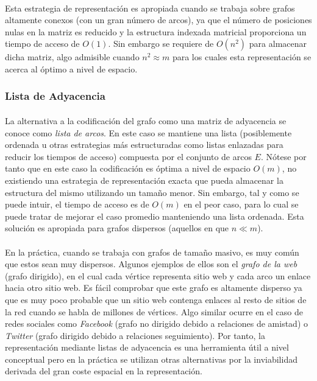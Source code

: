 \documentclass{subfiles}
\begin{document}
          \paragraph{}
          Esta estrategia de representación es apropiada cuando se trabaja sobre grafos altamente conexos (con un gran número de arcos), ya que el número de posiciones nulas en la matriz es reducido y la estructura indexada matricial proporciona un tiempo de acceso de $O(1)$. Sin embargo se requiere de $O(n^2)$ para almacenar dicha matriz, algo admisible cuando $n^2 \approx m$ para los cuales esta representación se acerca al óptimo a nivel de espacio.

        \subsubsection{Lista de Adyacencia}
        \label{sec:adjacency_list}

          \paragraph{}
          La alternativa a la codificación del grafo como una matriz de adyacencia se conoce como \emph{lista de arcos}. En este caso se mantiene una lista (posiblemente ordenada u otras estrategias más estructuradas como listas enlazadas para reducir los tiempos de acceso) compuesta por el conjunto de arcos $E$. Nótese por tanto que en este caso la codificación es óptima a nivel de espacio $O(m)$, no existiendo una estrategia de representación exacta que pueda almacenar la estructura del mismo utilizando un tamaño menor. Sin embargo, tal y como se puede intuir, el tiempo de acceso es de $O(m)$ en el peor caso, para lo cual se puede tratar de mejorar el caso promedio manteniendo una lista ordenada. Esta solución es apropiada para grafos dispersos (aquellos en que $n \ll m$).

        \paragraph{}
        En la práctica, cuando se trabaja con grafos de tamaño masivo, es muy común que estos sean muy dispersos. Algunos ejemplos de ellos son el \emph{grafo de la web} (grafo dirigido), en el cual cada vértice representa sitio web y cada arco un enlace hacia otro sitio web. Es fácil comprobar que este grafo es altamente disperso ya que es muy poco probable que un sitio web contenga enlaces al resto de sitios de la red cuando se habla de millones de vértices. Algo similar ocurre en el caso de redes sociales como \emph{Facebook} (grafo no dirigido debido a relaciones de amistad) o \emph{Twitter} (grafo dirigido debido a relaciones seguimiento). Por tanto, la representación mediante listas de adyacencia es una herramienta útil a nivel conceptual pero en la práctica se utilizan otras alternativas por la inviabilidad derivada del gran coste espacial en la representación.
\end{document}
